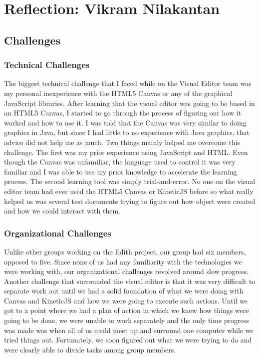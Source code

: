 \documentclass[a4paper]{article}
\begin{document}
\section{Reflection: Vikram Nilakantan}
\subsection{Challenges}
\subsubsection{Technical Challenges}

The biggest technical challenge that I faced while on the Visual Editor team was my personal inexperience with the HTML5 Canvas or any of the graphical JavaScript libraries. After learning that the visual editor was going to be based in an HTML5 Canvas, I started to go through the process of figuring out how it worked and how to use it. I was told that the Canvas was very similar to doing graphics in Java, but since I had little to no experience with Java graphics, that advice did not help me as much. Two things mainly helped me overcome this challenge. The first was my prior experience using JavaScript and HTML. Even though the Canvas was unfamiliar, the language used to control it was very familiar and I was able to use my prior knowledge to accelerate the learning process. The second learning tool was simply trial-and-error. No one on the visual editor team had ever used the HTML5 Canvas or KineticJS before so what really helped us was several test documents trying to figure out how object were created and how we could interact with them. 

\subsubsection{Organizational Challenges}

Unlike other groups working on the Edith project, our group had six members, opposed to five. Since none of us had any familiarity with the technologies we were working with, our organizational challenges revolved around slow progress. Another challenge that surrounded the visual editor is that it was very difficult to separate work out until we had a solid foundation of what we were doing with Canvas and KineticJS and how we were going to execute such actions. Until we got to a point where we had a plan of action in which we knew how things were going to be done, we were unable to work separately and the only time progress was made was when all of us could meet up and surround one computer while we tried things out. Fortunately, we soon figured out what we were trying to do and were clearly able to divide tasks among group members.
\end{document}
